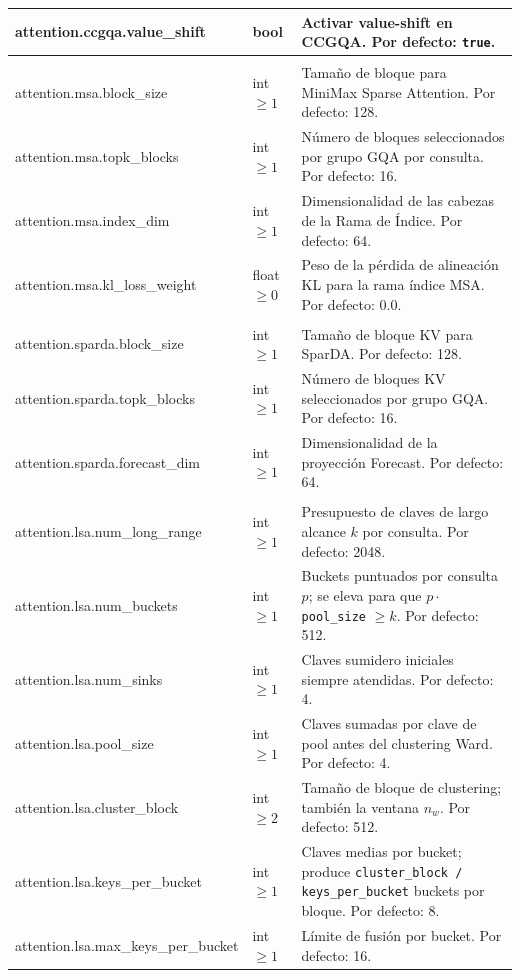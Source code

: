 \begin{longtable}{>{\ttfamily\footnotesize\raggedright\arraybackslash}p{5.6cm}>{\raggedright\arraybackslash}p{2.4cm}>{\raggedright\arraybackslash}p{6.9cm}}
attention.ccgqa.value\_shift & bool & Activar value-shift en CCGQA. Por defecto: \texttt{true}. \\
\midrule
\multicolumn{3}{l}{\textit{model.attention.msa.*}} \\
\midrule
attention.msa.block\_size & int $\ge 1$ & Tamaño de bloque para MiniMax Sparse Attention. Por defecto: 128. \\
attention.msa.topk\_blocks & int $\ge 1$ & Número de bloques seleccionados por grupo GQA por consulta. Por defecto: 16. \\
attention.msa.index\_dim & int $\ge 1$ & Dimensionalidad de las cabezas de la Rama de Índice. Por defecto: 64. \\
attention.msa.kl\_loss\_weight & float $\ge 0$ & Peso de la pérdida de alineación KL para la rama índice MSA. Por defecto: 0.0. \\
\midrule
\multicolumn{3}{l}{\textit{model.attention.sparda.*}} \\
\midrule
attention.sparda.block\_size & int $\ge 1$ & Tamaño de bloque KV para SparDA. Por defecto: 128. \\
attention.sparda.topk\_blocks & int $\ge 1$ & Número de bloques KV seleccionados por grupo GQA. Por defecto: 16. \\
attention.sparda.forecast\_dim & int $\ge 1$ & Dimensionalidad de la proyección Forecast. Por defecto: 64. \\
\midrule
\multicolumn{3}{l}{\textit{model.attention.lsa.*}} \\
\midrule
attention.lsa.num\_long\_range & int $\ge 1$ & Presupuesto de claves de largo alcance $k$ por consulta. Por defecto: 2048. \\
attention.lsa.num\_buckets & int $\ge 1$ & Buckets puntuados por consulta $p$; se eleva para que $p\cdot$\texttt{pool\_size} $\ge k$. Por defecto: 512. \\
attention.lsa.num\_sinks & int $\ge 1$ & Claves sumidero iniciales siempre atendidas. Por defecto: 4. \\
attention.lsa.pool\_size & int $\ge 1$ & Claves sumadas por clave de pool antes del clustering Ward. Por defecto: 4. \\
attention.lsa.cluster\_block & int $\ge 2$ & Tamaño de bloque de clustering; también la ventana $n_w$. Por defecto: 512. \\
attention.lsa.keys\_per\_bucket & int $\ge 1$ & Claves medias por bucket; produce \texttt{cluster\_block / keys\_per\_bucket} buckets por bloque. Por defecto: 8. \\
attention.lsa.max\_keys\_per\_bucket & int $\ge 1$ & Límite de fusión por bucket. Por defecto: 16. \\

\end{longtable}
